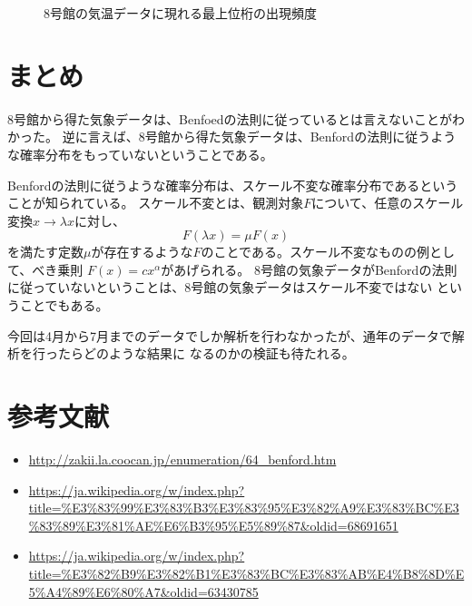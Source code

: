 \documentclass[jafontsize=9pt,twocolumn]{jlreq}
\begin{document}
\begin{figure}[b]
\label{8t-graph}
\centering
{}
\caption{8号館の気温データに現れる最上位桁の出現頻度}
\end{figure}


\section{まとめ}

8号館から得た気象データは、Benfoedの法則に従っているとは言えないことがわかった。
逆に言えば、8号館から得た気象データは、Benfordの法則に従うような確率分布をもっていないということである。

Benfordの法則に従うような確率分布は、スケール不変な確率分布であるということが知られている。
スケール不変とは、観測対象$F$について、任意のスケール変換$x \to \lambda x$に対し、
\[F(\lambda x) = \mu F(x)\]
を満たす定数$\mu$が存在するような$F$のことである。スケール不変なものの例として、べき乗則
$F(x)=cx^\alpha$があげられる。
8号館の気象データがBenfordの法則に従っていないということは、8号館の気象データはスケール不変ではない
ということでもある。

今回は4月から7月までのデータでしか解析を行わなかったが、通年のデータで解析を行ったらどのような結果に
なるのかの検証も待たれる。

\section{参考文献}
\begin{itemize}
\item \url{http://zakii.la.coocan.jp/enumeration/64_benford.htm}
\item \url{https://ja.wikipedia.org/w/index.php?title=%E3%83%99%E3%83%B3%E3%83%95%E3%82%A9%E3%83%BC%E3%83%89%E3%81%AE%E6%B3%95%E5%89%87&oldid=68691651}
\item \url{https://ja.wikipedia.org/w/index.php?title=%E3%82%B9%E3%82%B1%E3%83%BC%E3%83%AB%E4%B8%8D%E5%A4%89%E6%80%A7&oldid=63430785}
\end{itemize}
\end{document}
